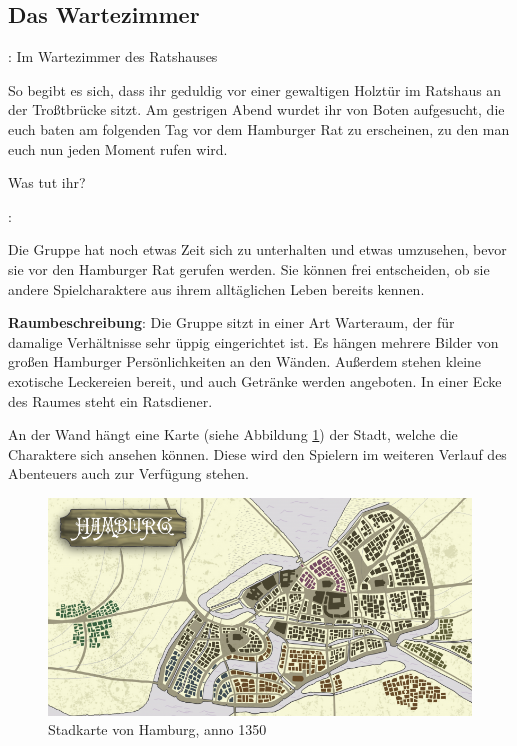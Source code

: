 
\subsection{Das Wartezimmer}

: Im Wartezimmer des Ratshauses

So begibt es sich, dass ihr geduldig vor einer gewaltigen Holztür im Ratshaus an der Troßtbrücke sitzt. Am gestrigen Abend wurdet ihr von Boten aufgesucht, die euch baten am folgenden Tag vor dem Hamburger Rat zu erscheinen, zu den man euch nun jeden Moment rufen wird.

Was tut ihr?

:

Die Gruppe hat noch etwas Zeit sich zu unterhalten und etwas umzusehen, bevor sie vor den Hamburger Rat gerufen werden. Sie können frei entscheiden, ob sie andere Spielcharaktere aus ihrem alltäglichen Leben bereits kennen.

\textbf{Raumbeschreibung}: Die Gruppe sitzt in einer Art Warteraum, der für damalige Verhältnisse sehr üppig eingerichtet ist. Es hängen mehrere Bilder von großen Hamburger Persönlichkeiten an den Wänden. Außerdem stehen kleine exotische Leckereien bereit, und auch Getränke werden angeboten. In einer Ecke des Raumes steht ein Ratsdiener.

An der Wand hängt eine Karte (siehe Abbildung \ref{fig:Karte}) der Stadt, welche die Charaktere sich ansehen können. Diese wird den Spielern im weiteren Verlauf des Abenteuers auch zur Verfügung stehen.

\begin{figure}[t]
	\begin{center}
		\includegraphics[scale=0.7]{./images/Karte.png}
		\caption{Stadkarte von Hamburg, anno 1350}
    \label{fig:Karte}
	\end{center}
\end{figure}


